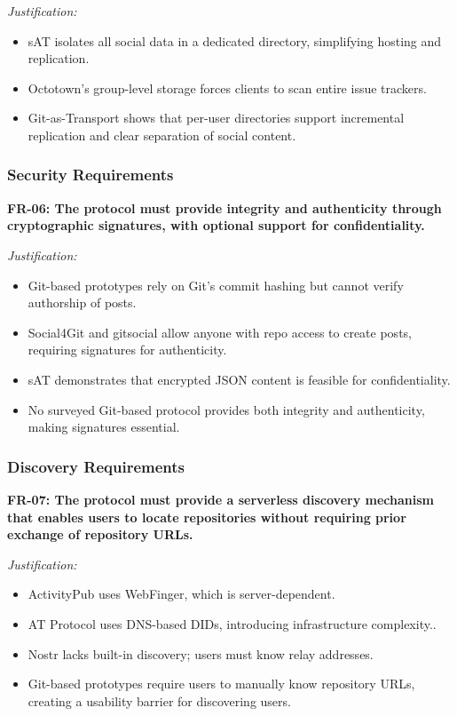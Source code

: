 \textit{Justification:}
\begin{itemize}
    \item sAT isolates all social data in a dedicated directory, simplifying hosting and replication.
    \item Octotown’s group-level storage forces clients to scan entire issue trackers.
    \item Git-as-Transport shows that per-user directories support incremental replication and clear separation of social content.
\end{itemize}

\subsubsection*{Security Requirements}

\textbf{FR-06: The protocol must provide integrity and authenticity through cryptographic signatures, with optional support for confidentiality.}

\textit{Justification:}
\begin{itemize}
    \item Git-based prototypes rely on Git’s commit hashing but cannot verify authorship of posts.
    \item Social4Git and gitsocial allow anyone with repo access to create posts, requiring signatures for authenticity.
    \item sAT demonstrates that encrypted JSON content is feasible for confidentiality.
    \item No surveyed Git-based protocol provides both integrity and authenticity, making signatures essential.
\end{itemize}

\subsubsection*{Discovery Requirements}

\textbf{FR-07: The protocol must provide a serverless discovery mechanism that enables users to locate repositories without requiring prior exchange of repository URLs.}

\textit{Justification:}
\begin{itemize}
    \item ActivityPub uses WebFinger, which is server-dependent.
    \item AT Protocol uses DNS-based DIDs, introducing infrastructure complexity..
    \item Nostr lacks built-in discovery; users must know relay addresses.
    \item Git-based prototypes require users to manually know repository URLs, creating a usability barrier for discovering users.
\end{itemize}

